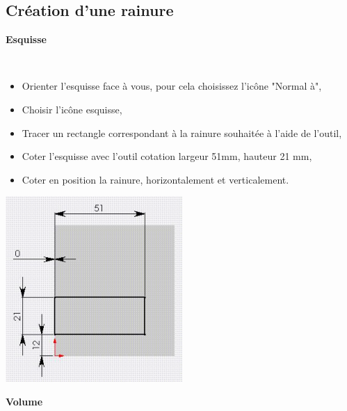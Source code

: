 \subsection{Création d'une rainure}

\textbf{Esquisse}

~\

\begin{minipage}{0.75\linewidth}
\begin{itemize}
 \item Orienter l'esquisse face à vous, pour cela choisissez l'icône "Normal à",
 \item Choisir l'icône esquisse,
 \item Tracer un rectangle correspondant à la rainure souhaitée à l'aide de l'outil,
 \item Coter l'esquisse avec l'outil cotation largeur 51mm, hauteur 21 mm,
 \item Coter en position la rainure, horizontalement et verticalement.
\end{itemize}
\end{minipage}
\hfill
\begin{minipage}{0.23\linewidth}
\includegraphics[width=0.9\linewidth]{img/008}
\end{minipage}

\textbf{Volume}

~\

